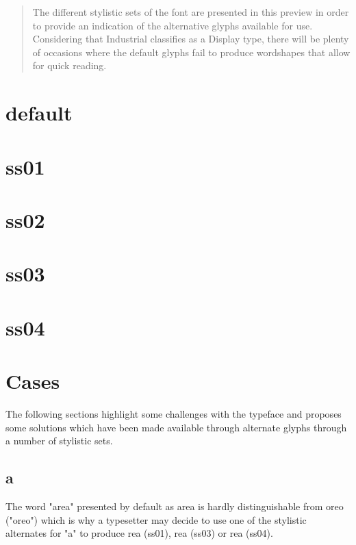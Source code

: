\documentclass[a4paper]{article}
\begin{document}
\title{}
\author{}
\maketitle
\begin{abstract}
  The different stylistic sets of the font are presented in this preview in order to provide an indication of the alternative glyphs available for use.
  Considering that Industrial classifies as a Display type, there will be plenty of occasions where the default glyphs fail to produce wordshapes that allow for quick reading.
\end{abstract}


\newpage
\section{default}
{\ssdefault }

\newpage
\section{ss01}
{\ssone }

\newpage
\section{ss02}
{\sstwo }

\newpage
\section{ss03}
{\ssthree }

\newpage
\section{ss04}
{\ssfour }


\newpage
\section{Cases}
The following sections highlight some challenges with the typeface and proposes
some solutions which have been made available through alternate glyphs through
a number of stylistic sets.

\subsection{a}
The word "area" presented by default as {\ssdefault area} is hardly
distinguishable from {\ssdefault oreo} ("oreo") which is why a typesetter may
decide to use one of the stylistic alternates for "a" to produce
{re{\ssone a}} (ss01),
{re{\ssthree a}} (ss03) or
{re{\ssfour a}} (ss04).
\end{document}
